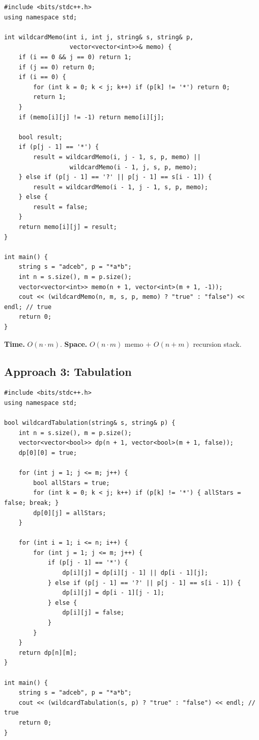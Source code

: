 \begin{lstlisting}
#include <bits/stdc++.h>
using namespace std;

int wildcardMemo(int i, int j, string& s, string& p,
                  vector<vector<int>>& memo) {
    if (i == 0 && j == 0) return 1;
    if (j == 0) return 0;
    if (i == 0) {
        for (int k = 0; k < j; k++) if (p[k] != '*') return 0;
        return 1;
    }
    if (memo[i][j] != -1) return memo[i][j];

    bool result;
    if (p[j - 1] == '*') {
        result = wildcardMemo(i, j - 1, s, p, memo) ||
                  wildcardMemo(i - 1, j, s, p, memo);
    } else if (p[j - 1] == '?' || p[j - 1] == s[i - 1]) {
        result = wildcardMemo(i - 1, j - 1, s, p, memo);
    } else {
        result = false;
    }
    return memo[i][j] = result;
}

int main() {
    string s = "adceb", p = "*a*b";
    int n = s.size(), m = p.size();
    vector<vector<int>> memo(n + 1, vector<int>(m + 1, -1));
    cout << (wildcardMemo(n, m, s, p, memo) ? "true" : "false") << endl; // true
    return 0;
}
\end{lstlisting}

\begin{complexitybox}
\textbf{Time.} $O(n \cdot m)$.
\textbf{Space.} $O(n \cdot m)$ memo $+$ $O(n+m)$ recursion stack.
\end{complexitybox}

\subsection*{Approach 3: Tabulation}

\begin{lstlisting}
#include <bits/stdc++.h>
using namespace std;

bool wildcardTabulation(string& s, string& p) {
    int n = s.size(), m = p.size();
    vector<vector<bool>> dp(n + 1, vector<bool>(m + 1, false));
    dp[0][0] = true;

    for (int j = 1; j <= m; j++) {
        bool allStars = true;
        for (int k = 0; k < j; k++) if (p[k] != '*') { allStars = false; break; }
        dp[0][j] = allStars;
    }

    for (int i = 1; i <= n; i++) {
        for (int j = 1; j <= m; j++) {
            if (p[j - 1] == '*') {
                dp[i][j] = dp[i][j - 1] || dp[i - 1][j];
            } else if (p[j - 1] == '?' || p[j - 1] == s[i - 1]) {
                dp[i][j] = dp[i - 1][j - 1];
            } else {
                dp[i][j] = false;
            }
        }
    }
    return dp[n][m];
}

int main() {
    string s = "adceb", p = "*a*b";
    cout << (wildcardTabulation(s, p) ? "true" : "false") << endl; // true
    return 0;
}
\end{lstlisting}

